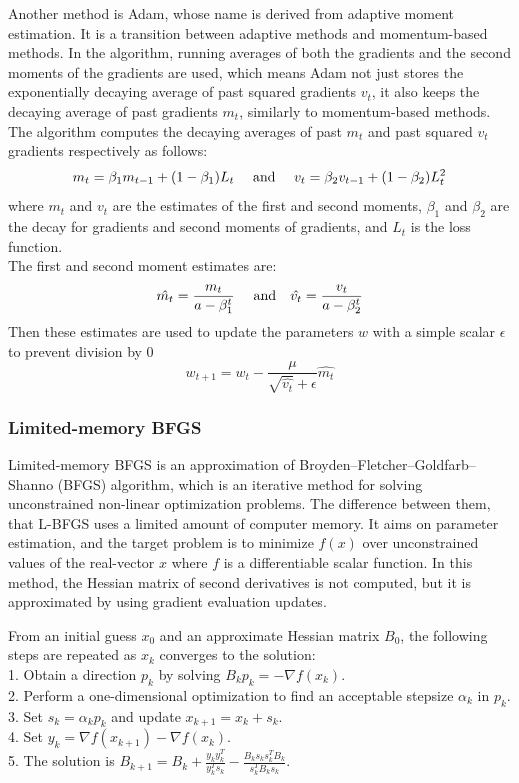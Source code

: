 Another method is Adam, whose name is derived from adaptive moment estimation. It is a transition between adaptive methods and momentum-based methods. In the algorithm, running averages of both the gradients and the second moments of the gradients are used, which means Adam not just stores the exponentially decaying average of past squared gradients $v_t$, it also keeps the decaying average of past gradients $m_t$, similarly to momentum-based methods. The algorithm computes the decaying averages of past $m_t$ and past squared $v_t$ gradients respectively as follows:
$$ m_t = \beta_1 m_{t-1} + (1-\beta_1)L_t ~~~~\hbox{and}~~~\ v_t = \beta_2 v_{t-1} + (1-\beta_2)L^2_t $$
where $m_t$ and $v_t$ are the estimates of the first and second moments, $\beta_1$ and $\beta_2$ are the decay for gradients and second moments of gradients, and $L_t$ is the loss function.\\
The first and second moment estimates are:
$$ \hat{m_t} = \frac{m_t}{a-\beta^t_1} ~~~~\hbox{and}~~~ \hat{v_t} = \frac{v_t}{a-\beta^t_2} $$
Then these estimates are used to update the parameters $w$ with a simple scalar $\epsilon$ to prevent division by 0
$$ w_{t+1} = w_t - \frac{\mu}{\sqrt{\hat{v_t}}+\epsilon}\hat{m_t} $$


\subsubsection{Limited-memory BFGS}

Limited-memory BFGS is an approximation of Broyden–Fletcher–Goldfarb–Shanno (BFGS) algorithm, which is an iterative method for solving unconstrained non-linear optimization problems. The difference between them, that L-BFGS uses a limited amount of computer memory. It aims on parameter estimation, and the target problem is to minimize $f(x)$ over unconstrained values of the real-vector $x$ where $f$ is a differentiable scalar function. In this method, the Hessian matrix of second derivatives is not computed, but it is approximated by using gradient evaluation updates. \medskip

\noindent From an initial guess $x_0$ and an approximate Hessian matrix $B_0$, the following steps are repeated as $x_k$ converges to the solution:\\
1. Obtain a direction $p_k$ by solving $B_k p_k = - \nabla f(x_k). $ \\
2. Perform a one-dimensional optimization to find an acceptable stepsize $\alpha_k$ in $p_k$. \\
3. Set $s_k = \alpha_k p_k$ and update $x_{k+1} = x_k + s_k.$ \\
4. Set $y_k = \nabla f(x_{k+1}) - \nabla f(x_k).$ \\ 
5. The solution is $B_{k+1} = B_k + \frac{y_k y^T_k}{y^T_k s_k} - \frac{B_k s_k s^T_k B_k}{s^T_k B_k s_k}.$

